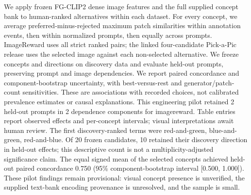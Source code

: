 We apply frozen FG-CLIP2 dense image features and the full supplied concept bank to human-ranked alternatives within each dataset. For every concept, we average preferred-minus-rejected maximum patch similarities within annotation events, then within normalized prompts, then equally across prompts. ImageReward uses all strict ranked pairs; the linked four-candidate Pick-a-Pic release uses the selected image against each non-selected alternative. We freeze concepts and directions on discovery data and evaluate held-out prompts, preserving prompt and image dependencies. We report paired concordance and component-bootstrap uncertainty, with best-versus-rest and generator/patch-count sensitivities. These are associations with recorded choices, not calibrated prevalence estimates or causal explanations. This engineering pilot retained 2 held-out prompts in 2 dependence components for imagereward. Table entries report observed effects and per-concept intervals; visual interpretations await human review.
The first discovery-ranked terms were red-and-green, blue-and-green, red-and-blue. Of 20 frozen candidates, 10 retained their discovery direction in held-out effects; this descriptive count is not a multiplicity-adjusted significance claim. The equal signed mean of the selected concepts achieved held-out paired concordance 0.750 (95\% component-bootstrap interval [0.500, 1.000]). These pilot findings remain provisional: visual concept presence is unverified, the supplied text-bank encoding provenance is unresolved, and the sample is small.
